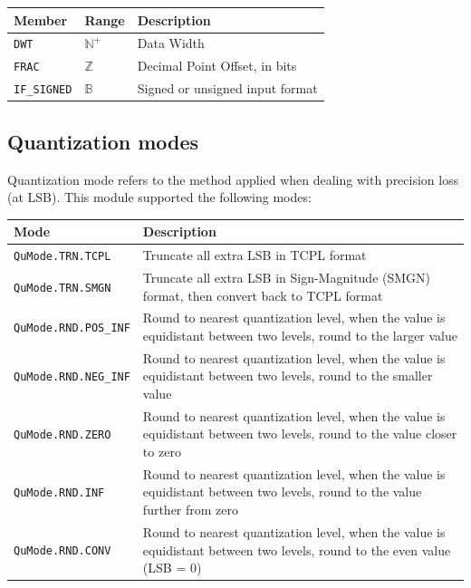 \documentclass[a4paper, oneside]{report}
\begin{document}
            \begin{longtable}{lll}
                \toprule
                \textbf{Member} & \textbf{Range} & \textbf{Description} \\
                \midrule
                \texttt{DWT} &  $\mathbb{N}^{+}$ & Data Width \\
                \texttt{FRAC} & $\mathbb{Z}$ & Decimal Point Offset, in bits \\
                \texttt{IF\_SIGNED} & $\mathbb{B}$ & Signed or unsigned input format \\
                \bottomrule
            \end{longtable}

            \subsection{Quantization modes}\label{ch:func:sec:param:subsec:QuMode}
            Quantization mode refers to the method applied when dealing with precision loss (at LSB). This module supported the following modes:
            \begin{longtable}{lp{}}
                \toprule
                \textbf{Mode} & \textbf{Description} \\
                \midrule
                \texttt{QuMode.TRN.TCPL} & Truncate all extra LSB in TCPL format \\
                \texttt{QuMode.TRN.SMGN} & Truncate all extra LSB in Sign-Magnitude (SMGN) format, then convert back to TCPL format \\
                \texttt{QuMode.RND.POS\_INF} & Round to nearest quantization level, when the value is equidistant between two levels, round to the larger value  \\
                \texttt{QuMode.RND.NEG\_INF} & Round to nearest quantization level, when the value is equidistant between two levels, round to the smaller value  \\
                \texttt{QuMode.RND.ZERO} & Round to nearest quantization level, when the value is equidistant between two levels, round to the value closer to zero  \\
                \texttt{QuMode.RND.INF} & Round to nearest quantization level, when the value is equidistant between two levels, round to the value further from zero  \\
                \texttt{QuMode.RND.CONV} & Round to nearest quantization level, when the value is equidistant between two levels, round to the even value (LSB = 0) \\
                \bottomrule
            \end{longtable}
\end{document}
